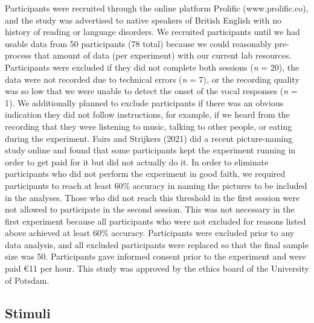 \documentclass[
  man,floatsintext]{apa6}
\begin{document}
Participants were recruited through the online platform Prolific (www.prolific.co), and the study was advertised to native speakers of British English with no history of reading or language disorders. We recruited participants until we had usable data from 50 participants (78 total) because we could reasonably pre-process that amount of data (per experiment) with our current lab resources. Participants were excluded if they did not complete both sessions (\emph{n} = 20), the data were not recorded due to technical errors (\emph{n} = 7), or the recording quality was so low that we were unable to detect the onset of the vocal responses (\emph{n} = 1). We additionally planned to exclude participants if there was an obvious indication they did not follow instructions, for example, if we heard from the recording that they were listening to music, talking to other people, or eating during the experiment. Fairs and Strijkers (2021) did a recent picture-naming study online and found that some participants kept the experiment running in order to get paid for it but did not actually do it. In order to eliminate participants who did not perform the experiment in good faith, we required participants to reach at least 60\% accuracy in naming the pictures to be included in the analyses. Those who did not reach this threshold in the first session were not allowed to participate in the second session. This was not necessary in the first experiment because all participants who were not excluded for reasons listed above achieved at least 60\% accuracy. Participants were excluded prior to any data analysis, and all excluded participants were replaced so that the final sample size was 50. Participants gave informed consent prior to the experiment and were paid €11 per hour. This study was approved by the ethics board of the University of Potsdam.

\hypertarget{stimuli}{%
\subsection{Stimuli}\label{stimuli}}
\end{document}
